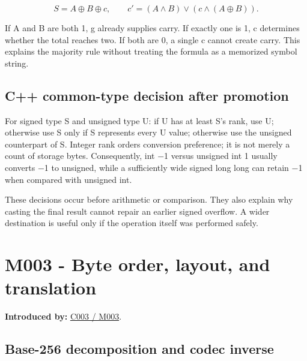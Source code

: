 \[
S=A\oplus B\oplus c,\qquad c'=(A\land B)\lor(c\land(A\oplus B)).
\]

If A and B are both 1, g already supplies carry. If exactly one is 1, c determines whether the total reaches two. If both are 0, a single c cannot create carry. This explains the majority rule without treating the formula as a memorized symbol string.

\subsection{C++ common-type decision after promotion}\label{01-foundations-i-ch011-c-common-type-decision-after-promotion}

\hypertarget{01-foundations-i-ch011-c-common-type-decision-after-promotion}{}

For signed type S and unsigned type U: if U has at least S's rank, use U; otherwise use S only if S represents every U value; otherwise use the unsigned counterpart of S. Integer rank orders conversion preference; it is not merely a count of storage bytes. Consequently, int −1 versus unsigned int 1 usually converts −1 to unsigned, while a sufficiently wide signed long long can retain −1 when compared with unsigned int.

These decisions occur before arithmetic or comparison. They also explain why casting the final result cannot repair an earlier signed overflow. A wider destination is useful only if the operation itself was performed safely.

\section{M003 - Byte order, layout, and translation}\label{01-foundations-i-ch011-m003---byte-order-layout-and-translation}

\hypertarget{01-foundations-i-ch011-m003---byte-order-layout-and-translation}{}

\textbf{Introduced by:} \hyperref[01-foundations-i-ch002-where-the-bytes-live]{C003 / M003}.

\subsection{Base-256 decomposition and codec inverse}\label{01-foundations-i-ch011-base-256-decomposition-and-codec-inverse}

\hypertarget{01-foundations-i-ch011-base-256-decomposition-and-codec-inverse}{}

